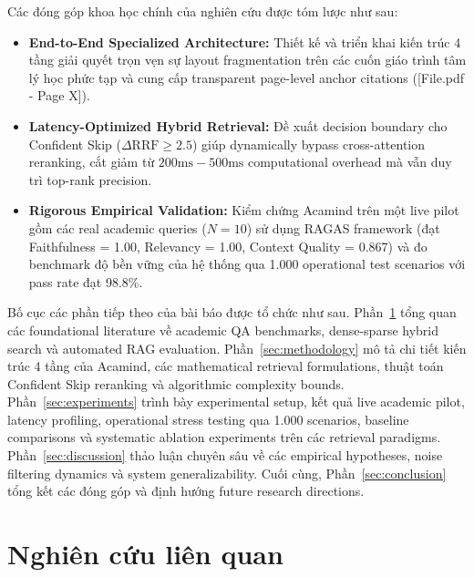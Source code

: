 \documentclass[10pt]{SPIIRAS_Proceedings}
\begin{document}
Các đóng góp khoa học chính của nghiên cứu được tóm lược như sau:
\begin{itemize}
    \item \textbf{End-to-End Specialized Architecture:} Thiết kế và triển khai kiến trúc 4 tầng giải quyết trọn vẹn sự layout fragmentation trên các cuốn giáo trình tâm lý học phức tạp và cung cấp transparent page-level anchor citations ([File.pdf - Page X]).
    \item \textbf{Latency-Optimized Hybrid Retrieval:} Đề xuất decision boundary cho Confident Skip ($\Delta \text{RRF} \ge 2.5$) giúp dynamically bypass cross-attention reranking, cắt giảm từ $200\text{ms}-500\text{ms}$ computational overhead mà vẫn duy trì top-rank precision.
    \item \textbf{Rigorous Empirical Validation:} Kiểm chứng Acamind trên một live pilot gồm các real academic queries ($N=10$) sử dụng RAGAS framework (đạt Faithfulness = 1.00, Relevancy = 1.00, Context Quality = 0.867) và đo benchmark độ bền vững của hệ thống qua 1.000 operational test scenarios với pass rate đạt 98.8\%.
\end{itemize}

Bố cục các phần tiếp theo của bài báo được tổ chức như sau. Phần~\ref{sec:related_work} tổng quan các foundational literature về academic QA benchmarks, dense-sparse hybrid search và automated RAG evaluation. Phần~\ref{sec:methodology} mô tả chi tiết kiến trúc 4 tầng của Acamind, các mathematical retrieval formulations, thuật toán Confident Skip reranking và algorithmic complexity bounds. Phần~\ref{sec:experiments} trình bày experimental setup, kết quả live academic pilot, latency profiling, operational stress testing qua 1.000 scenarios, baseline comparisons và systematic ablation experiments trên các retrieval paradigms. Phần~\ref{sec:discussion} thảo luận chuyên sâu về các empirical hypotheses, noise filtering dynamics và system generalizability. Cuối cùng, Phần~\ref{sec:conclusion} tổng kết các đóng góp và định hướng future research directions.

\section{Nghiên cứu liên quan}\label{sec:related_work}
\end{document}
